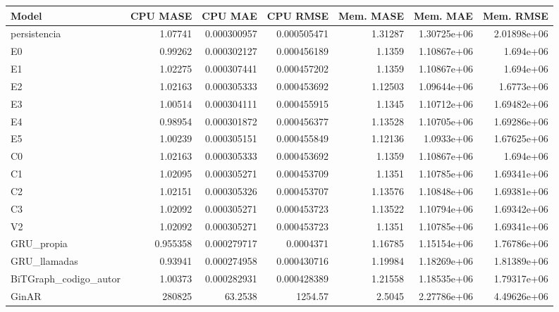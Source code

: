 \begin{tabular}{lrrrrrr}
\toprule
Model & CPU MASE & CPU MAE & CPU RMSE & Mem. MASE & Mem. MAE & Mem. RMSE \\
\midrule
persistencia & 1.07741 & 0.000300957 & 0.000505471 & 1.31287 & 1.30725e+06 & 2.01898e+06 \\
E0 & 0.99262 & 0.000302127 & 0.000456189 & 1.1359 & 1.10867e+06 & 1.694e+06 \\
E1 & 1.02275 & 0.000307441 & 0.000457202 & 1.1359 & 1.10867e+06 & 1.694e+06 \\
E2 & 1.02163 & 0.000305333 & 0.000453692 & 1.12503 & 1.09644e+06 & 1.6773e+06 \\
E3 & 1.00514 & 0.000304111 & 0.000455915 & 1.1345 & 1.10712e+06 & 1.69482e+06 \\
E4 & 0.98954 & 0.000301872 & 0.000456377 & 1.13528 & 1.10705e+06 & 1.69286e+06 \\
E5 & 1.00239 & 0.000305151 & 0.000455849 & 1.12136 & 1.0933e+06 & 1.67625e+06 \\
C0 & 1.02163 & 0.000305333 & 0.000453692 & 1.1359 & 1.10867e+06 & 1.694e+06 \\
C1 & 1.02095 & 0.000305271 & 0.000453709 & 1.1351 & 1.10785e+06 & 1.69341e+06 \\
C2 & 1.02151 & 0.000305326 & 0.000453707 & 1.13576 & 1.10848e+06 & 1.69381e+06 \\
C3 & 1.02092 & 0.000305271 & 0.000453723 & 1.13522 & 1.10794e+06 & 1.69342e+06 \\
V2 & 1.02092 & 0.000305271 & 0.000453723 & 1.1351 & 1.10785e+06 & 1.69341e+06 \\
GRU\_propia & 0.955358 & 0.000279717 & 0.0004371 & 1.16785 & 1.15154e+06 & 1.76786e+06 \\
GRU\_llamadas & 0.93941 & 0.000274958 & 0.000430716 & 1.19984 & 1.18269e+06 & 1.81389e+06 \\
BiTGraph\_codigo\_autor & 1.00373 & 0.000282931 & 0.000428389 & 1.21558 & 1.18535e+06 & 1.79317e+06 \\
GinAR & 280825 & 63.2538 & 1254.57 & 2.5045 & 2.27786e+06 & 4.49626e+06 \\
\bottomrule
\end{tabular}